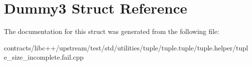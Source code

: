 \hypertarget{struct_dummy3}{}\section{Dummy3 Struct Reference}
\label{struct_dummy3}


The documentation for this struct was generated from the following file\+:\begin{DoxyCompactItemize}
\item 
contracts/libc++/upstream/test/std/utilities/tuple/tuple.\+tuple/tuple.\+helper/tuple\+\_\+size\+\_\+incomplete.\+fail.\+cpp\end{DoxyCompactItemize}
